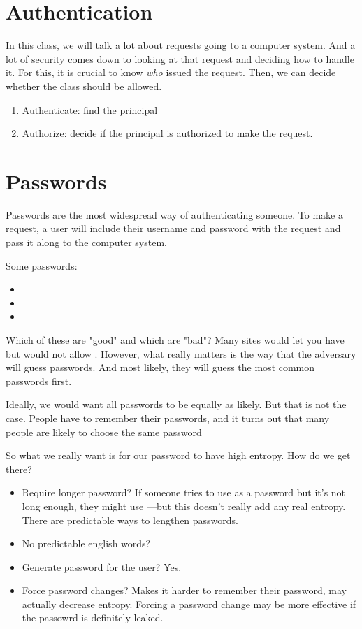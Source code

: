 \section{Authentication}
In this class, we will talk a lot about requests going to a computer system. And a lot of security comes down to looking at that request and deciding how to handle it. For this, it is crucial to know \textit{who} issued the request. Then, we can decide whether the class should be allowed.

\begin{enumerate}
	\item Authenticate: find the principal
	\item Authorize: decide if the principal is authorized to make the request.
\end{enumerate}

\section{Passwords}
Passwords are the most widespread way of authenticating someone. To make a request, a user will include their username and password with the request and pass it along to the computer system.

Some passwords:
\begin{itemize}
	\item {}
	\item {}
	\item {}
\end{itemize}

Which of these are "good" and which are "bad"? Many sites would let you have  but would not allow . However, what really matters is the way that the adversary will guess passwords. And most likely, they will guess the most common passwords first.


Ideally, we would want all passwords to be equally as likely. But that is not the case. People have to remember their passwords, and it turns out that many people are likely to choose the same password


So what we really want is for our password to have high entropy. How do we get there?

\begin{itemize}
	\item Require longer password? If someone tries to use  as a password but it's not long enough, they might use ---but this doesn't really add any real entropy. There are predictable ways to lengthen passwords.
	\item No predictable english words?
	\item Generate password for the user? Yes.
	\item Force password changes? Makes it harder to remember their password, may actually decrease entropy. Forcing a password change may be more effective if the passowrd is definitely leaked. 
\end{itemize}


